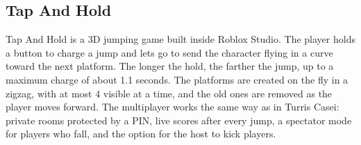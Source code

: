 \documentclass[12pt,letterpaper]{article}
\begin{document}
\clearpage

\subsection{Tap And Hold}

Tap And Hold is a 3D jumping game built inside Roblox Studio. The player holds a button to charge a jump and lets go to send the character flying in a curve toward the next platform. The longer the hold, the farther the jump, up to a maximum charge of about 1.1 seconds. The platforms are created on the fly in a zigzag, with at most 4 visible at a time, and the old ones are removed as the player moves forward. The multiplayer works the same way as in Turris Casei: private rooms protected by a PIN, live scores after every jump, a spectator mode for players who fall, and the option for the host to kick players.
\end{document}
